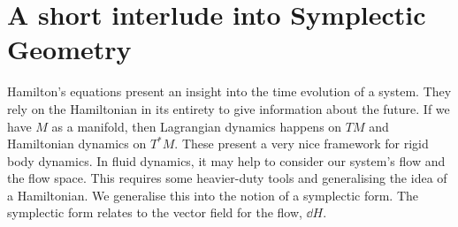 
\section{A short interlude into Symplectic Geometry}
Hamilton's equations present an insight into the time evolution of a system. They rely on the Hamiltonian in its entirety to give information about the future. If we have $M$ as a manifold, then Lagrangian dynamics happens on $TM$ and Hamiltonian dynamics on $T^*M$. These present a very nice framework for rigid body dynamics. In fluid dynamics, it may help to consider our system's flow and the flow space. This requires some heavier-duty tools and generalising the idea of a Hamiltonian. We generalise this into the notion of a symplectic form. The symplectic form relates to the vector field for the flow, $\dd H$.\\

